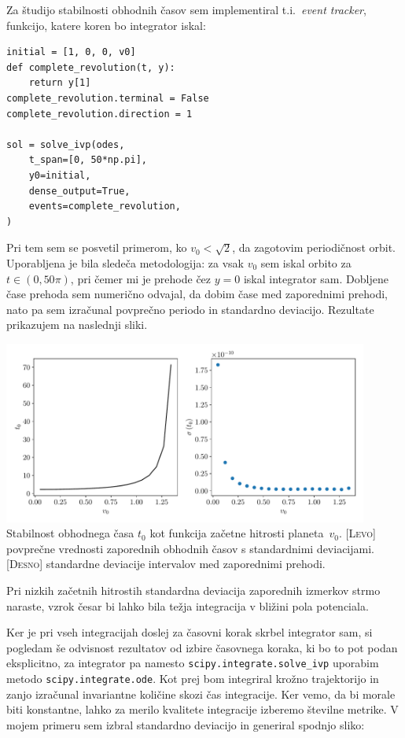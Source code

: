 \clearpage

Za študijo stabilnosti obhodnih časov sem implementiral t.i.~\emph{event tracker},
funkcijo, katere koren bo integrator iskal:

\begin{verbatim}
initial = [1, 0, 0, v0]
def complete_revolution(t, y):
    return y[1]
complete_revolution.terminal = False
complete_revolution.direction = 1

sol = solve_ivp(odes,
    t_span=[0, 50*np.pi],
    y0=initial,
    dense_output=True,
    events=complete_revolution,
)
\end{verbatim}

Pri tem sem se posvetil primerom, ko $v_0<\sqrt{2}$, da zagotovim periodičnost
orbit. Uporabljena je bila sledeča metodologija: za vsak $v_0$ sem iskal orbito
za $t\in \left(0, 50\pi \right)$, pri čemer mi je prehode čez $y=0$ iskal
integrator sam.  Dobljene čase prehoda sem numerično odvajal, da dobim čase med
zaporednimi prehodi, nato pa sem izračunal povprečno periodo in standardno
deviacijo. Rezultate prikazujem na naslednji sliki.


\begin{center}
    \centering
    \includegraphics[width=0.9\textwidth]{../images/1-2-t0_abs.pdf}
    {Stabilnost obhodnega časa $t_0$ kot funkcija začetne hitrosti planeta~$v_0$. [\textsc{Levo}] povprečne vrednosti zaporednih
        obhodnih časov s standardnimi deviacijami. [\textsc{Desno}] standardne
        deviacije intervalov med zaporednimi prehodi.}
\end{center}

Pri nizkih začetnih hitrostih standardna deviacija zaporednih izmerkov strmo
naraste, vzrok česar bi lahko bila težja integracija v bližini pola potenciala.

Ker je pri vseh integracijah doslej za časovni korak skrbel integrator sam, si
pogledam še odvisnost rezultatov od izbire časovnega koraka, ki bo to pot podan
eksplicitno, za integrator pa namesto \texttt{scipy.integrate.solve\_ivp}
uporabim  metodo \texttt{scipy.integrate.ode}. Kot prej bom integriral krožno
trajektorijo in zanjo izračunal invariantne količine skozi čas integracije. Ker
vemo, da bi morale biti konstantne, lahko za merilo kvalitete integracije
izberemo številne metrike. V mojem primeru sem izbral standardno deviacijo in
generiral spodnjo sliko:


